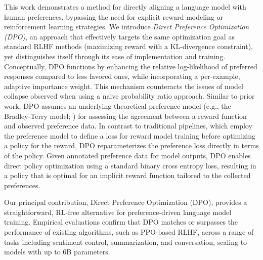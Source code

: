 This work demonstrates a method for directly aligning a language model with human preferences, bypassing the need for explicit reward modeling or reinforcement learning strategies. We introduce \textit{{Direct Preference Optimization} (DPO)}, an approach that effectively targets the same optimization goal as standard RLHF methods (maximizing reward with a KL-divergence constraint), yet distinguishes itself through its ease of implementation and training. Conceptually, DPO functions by enhancing the relative log-likelihood of preferred responses compared to less favored ones, while incorporating a per-example, adaptive importance weight. This mechanism counteracts the issues of model collapse observed when using a naive probability ratio approach. Similar to prior work, DPO assumes an underlying theoretical preference model (e.g., the Bradley-Terry model; \cite{bradley1952rankanalysis}) for assessing the agreement between a reward function and observed preference data. In contrast to traditional pipelines, which employ the preference model to define a loss for reward model training before optimizing a policy for the reward, DPO reparameterizes the preference loss directly in terms of the policy. Given annotated preference data for model outputs, DPO enables direct policy optimization using a standard binary cross entropy loss, resulting in a policy that is optimal for an implicit reward function tailored to the collected preferences.

Our principal contribution, Direct Preference Optimization (DPO), provides a straightforward, RL-free alternative for preference-driven language model training. Empirical evaluations confirm that DPO matches or surpasses the performance of existing algorithms, such as PPO-based RLHF, across a range of tasks including sentiment control, summarization, and conversation, scaling to models with up to 6B parameters.

